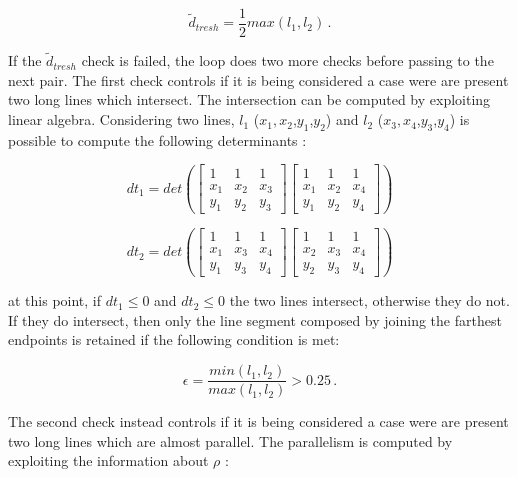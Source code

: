 \begin{equation}
\tilde{d}_{tresh} = {\frac{1}{2}} max(l_1, l_2) \,.
\end{equation}

If the $\tilde{d}_{tresh}$ check is failed, the loop does two more checks before passing to the next pair. The first check controls if it is being considered a case were are present two long lines which intersect. The intersection can be computed by exploiting linear algebra. Considering two lines, $l_1$ ($x_1,x_2$,$y_1$,$y_2$) and $l_2$ ($x_3,x_4$,$y_3$,$y_4$) is possible to compute the following determinants : 

\begin{equation}
dt_1 = det \left(
  \begin{bmatrix}
    1 & 1 & 1 \\
    x_1 & x_2 & x_3 \\
    y_1 & y_2 & y_3
  \end{bmatrix}
  \begin{bmatrix}
    1 & 1 & 1 \\
    x_1 & x_2 & x_4 \\
    y_1 & y_2 & y_4
  \end{bmatrix}  
\right)
\end{equation}

\begin{equation}
dt_2 = det \left(
  \begin{bmatrix}
    1 & 1 & 1 \\
    x_1 & x_3 & x_4 \\
    y_1 & y_3 & y_4
  \end{bmatrix}
  \begin{bmatrix}
    1 & 1 & 1 \\
    x_2 & x_3 & x_4 \\
    y_2 & y_3 & y_4
  \end{bmatrix}  
\right)
\end{equation}

at this point, if $dt_1  \leqslant 0$ and $dt_2  \leqslant 0$ the two lines intersect, otherwise they do not.
If they do intersect, then only the line segment composed by joining the farthest endpoints is retained if the following condition is met:

\begin{equation}
\epsilon = \frac{min(l_1,l_2)}{max(l_1,l_2)} > 0.25 \,.
\end{equation}

The second check instead controls if it is being considered a case were are present two long lines which are almost parallel. The parallelism is computed by exploiting the information about $\rho$ :

